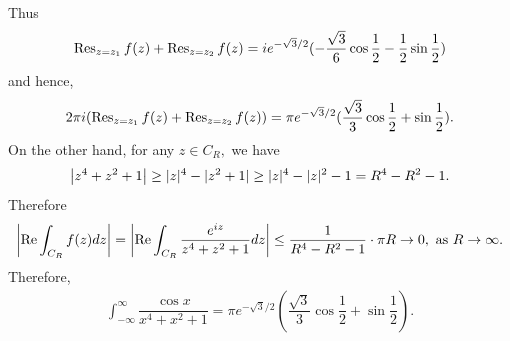 \begin{problem}
\begin{solution}
\begin{align*}
    \end{align*}
    Thus 
    \begin{align*}
         \operatorname{Res}_{z = z_1} f(z)+ \operatorname{Res}_{z = z_2} f(z)=ie^{-\sqrt{3}/2}(-\dfrac{\sqrt{3}}{6}\cos\dfrac{1}{2}-\dfrac{1}{2}\sin\dfrac{1}{2})
    \end{align*}
    and hence,
    \begin{align*}
        2\pi i( \operatorname{Res}_{z = z_1} f(z)+ \operatorname{Res}_{z = z_2} f(z))=\pi e^{-\sqrt{3}/2}(\dfrac{\sqrt{3}}{3}\cos\dfrac{1}{2}+\sin\dfrac{1}{2}).
    \end{align*}
    On the other hand, for any $z\in C_R,$ we have 
    \begin{align*}
        \left\lvert z^4+z^2+1\right\rvert\ge |z|^4-|z^2+1|\ge |z|^4-|z|^2-1=R^4-R^2-1.
    \end{align*}
    Therefore
    \begin{align*}
        \left\lvert \operatorname{Re}\int_{C_R}f(z)dz\right\rvert=\left\lvert \operatorname{Re}\int_{C_R}\dfrac{e^{iz}}{z^4+z^2+1} dz\right\rvert\le \dfrac{1}{R^4-R^2-1}\cdot \pi R\rightarrow 0,\text{ as }R\rightarrow\infty.
    \end{align*}
    Therefore, 
    \begin{align*}
        \int_{-\infty}^\infty\dfrac{\cos x}{x^4+x^2+1}=\pi e^{-\sqrt{3}/2}(\dfrac{\sqrt{3}}{3}\cos\dfrac{1}{2}+\sin\dfrac{1}{2}).
    \end{align*}
\end{solution}
\end{problem}

